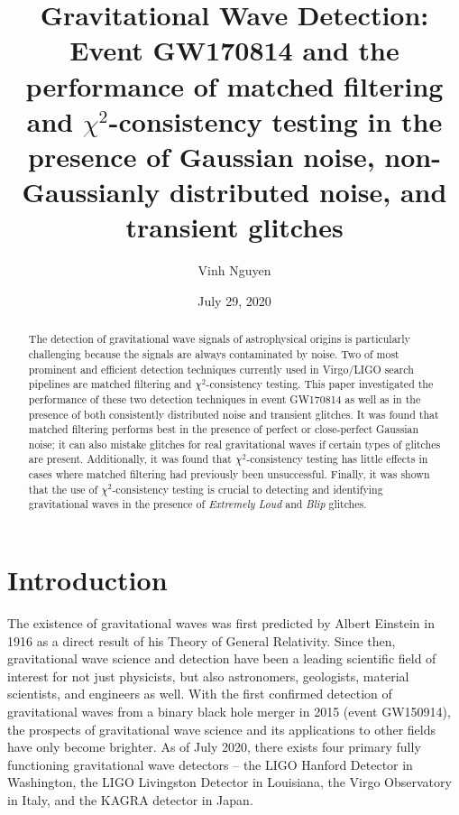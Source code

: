 \documentclass[preprint,
letterpaper,
 amsmath,amssymb,
 aps,
]{revtex4-2}
\begin{document}
\title{Gravitational Wave Detection:\\
Event GW170814 and the performance of matched filtering and $\chi^2$-consistency testing in the presence of Gaussian noise, non-Gaussianly distributed noise, and transient glitches}
\author{Vinh Nguyen}
\date{July 29, 2020}
\begin{abstract}
The detection of gravitational wave signals of astrophysical origins is particularly challenging because the signals are always contaminated by noise. Two of most prominent and efficient detection techniques currently used in Virgo/LIGO search pipelines are matched filtering and $\chi^2$-consistency testing. This paper investigated the performance of these two detection techniques in event GW170814 as well as in the presence of both consistently distributed noise and transient glitches. It was found that matched filtering performs best in the presence of perfect or close-perfect Gaussian noise; it can also mistake glitches for real gravitational waves if certain types of glitches are present. Additionally, it was found that $\chi^2$-consistency testing has little effects in cases where matched filtering had previously been unsuccessful. Finally, it was shown that the use of $\chi^2$-consistency testing is crucial to detecting and identifying gravitational waves in the presence of \textit{Extremely Loud} and \textit{Blip} glitches.
\end{abstract}

\maketitle
\section{Introduction}
The existence of gravitational waves was first predicted by Albert Einstein in 1916 as a direct result of his Theory of General Relativity. Since then, gravitational wave science and detection have been a leading scientific field of interest for not just physicists, but also astronomers, geologists, material scientists, and engineers as well. With the first confirmed detection of gravitational waves from a binary black hole merger in 2015 (event GW150914), the prospects of gravitational wave science and its applications to other fields have only become brighter. As of July 2020, there exists four primary fully functioning gravitational wave detectors – the LIGO Hanford Detector in Washington, the LIGO Livingston Detector in Louisiana, the Virgo Observatory in Italy, and the KAGRA detector in Japan. 
\end{document}
